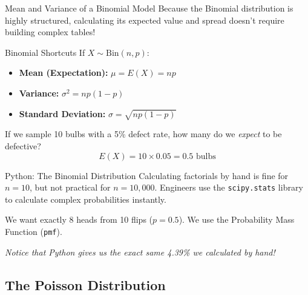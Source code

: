 \begin{frame}{Mean and Variance of a Binomial Model}
    Because the Binomial distribution is highly structured, calculating its expected value and spread doesn't require building complex tables!

    \vspace{0.3cm}
    \begin{block}{Binomial Shortcuts}
        If $X \sim \text{Bin}(n, p)$:
        \begin{itemize}
            \item \textbf{Mean (Expectation):} $\mu = E(X) = np$
            \item \textbf{Variance:} $\sigma^2 = np(1-p)$
            \item \textbf{Standard Deviation:} $\sigma = \sqrt{np(1-p)}$
        \end{itemize}
    \end{block}

    \pause \vspace{0.3cm}
    \begin{example}
        If we sample 10 bulbs with a 5\% defect rate, how many do we \textit{expect} to be defective?
        \[ E(X) = 10 \times 0.05 = \mathbf{0.5} \text{ bulbs} \]
    \end{example}
\end{frame}

\begin{frame}[fragile]{Python: The Binomial Distribution}
    Calculating factorials by hand is fine for $n=10$, but not practical for $n=10,000$. Engineers use the \texttt{scipy.stats} library to calculate complex probabilities instantly.

    We want exactly 8 heads from 10 flips ($p=0.5$). We use the Probability Mass Function (\texttt{pmf}).


    \textit{Notice that Python gives us the exact same 4.39\% we calculated by hand!}
\end{frame}


\subsection{The Poisson Distribution}


